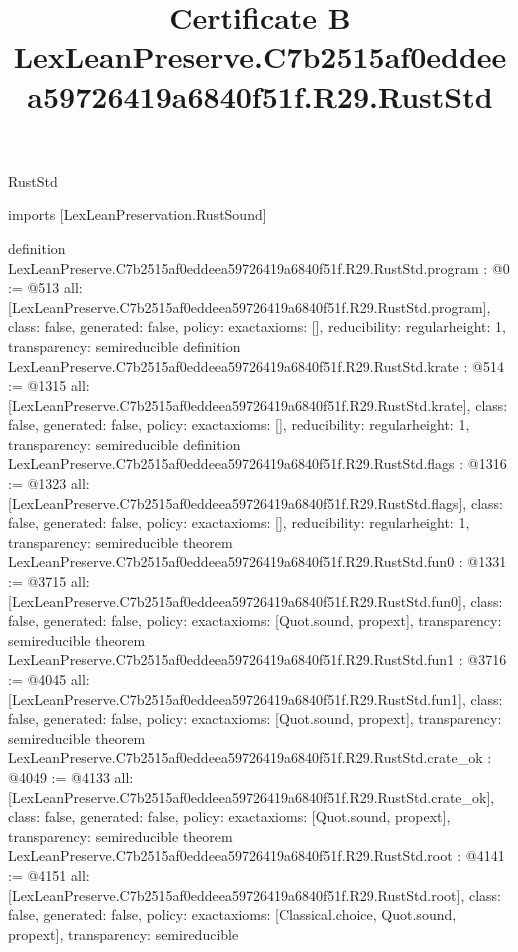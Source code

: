 \begin{lexlean}{RustStd}
\title{Certificate B LexLeanPreserve.C7b2515af0eddeea59726419a6840f51f.R29.RustStd}
\begin{coremodule}
imports [LexLeanPreservation.RustSound]

definition LexLeanPreserve.C7b2515af0eddeea59726419a6840f51f.R29.RustStd.program : @0 := @513 {
  all: [LexLeanPreserve.C7b2515af0eddeea59726419a6840f51f.R29.RustStd.program],
  class: false,
  generated: false,
  policy: exact{axioms: []},
  reducibility: regular{height: 1},
  transparency: semireducible
}
definition LexLeanPreserve.C7b2515af0eddeea59726419a6840f51f.R29.RustStd.krate : @514 := @1315 {
  all: [LexLeanPreserve.C7b2515af0eddeea59726419a6840f51f.R29.RustStd.krate],
  class: false,
  generated: false,
  policy: exact{axioms: []},
  reducibility: regular{height: 1},
  transparency: semireducible
}
definition LexLeanPreserve.C7b2515af0eddeea59726419a6840f51f.R29.RustStd.flags : @1316 := @1323 {
  all: [LexLeanPreserve.C7b2515af0eddeea59726419a6840f51f.R29.RustStd.flags],
  class: false,
  generated: false,
  policy: exact{axioms: []},
  reducibility: regular{height: 1},
  transparency: semireducible
}
theorem LexLeanPreserve.C7b2515af0eddeea59726419a6840f51f.R29.RustStd.fun0 : @1331 := @3715 {
  all: [LexLeanPreserve.C7b2515af0eddeea59726419a6840f51f.R29.RustStd.fun0],
  class: false,
  generated: false,
  policy: exact{axioms: [Quot.sound, propext]},
  transparency: semireducible
}
theorem LexLeanPreserve.C7b2515af0eddeea59726419a6840f51f.R29.RustStd.fun1 : @3716 := @4045 {
  all: [LexLeanPreserve.C7b2515af0eddeea59726419a6840f51f.R29.RustStd.fun1],
  class: false,
  generated: false,
  policy: exact{axioms: [Quot.sound, propext]},
  transparency: semireducible
}
theorem LexLeanPreserve.C7b2515af0eddeea59726419a6840f51f.R29.RustStd.crate_ok : @4049 := @4133 {
  all: [LexLeanPreserve.C7b2515af0eddeea59726419a6840f51f.R29.RustStd.crate_ok],
  class: false,
  generated: false,
  policy: exact{axioms: [Quot.sound, propext]},
  transparency: semireducible
}
theorem LexLeanPreserve.C7b2515af0eddeea59726419a6840f51f.R29.RustStd.root : @4141 := @4151 {
  all: [LexLeanPreserve.C7b2515af0eddeea59726419a6840f51f.R29.RustStd.root],
  class: false,
  generated: false,
  policy: exact{axioms: [Classical.choice, Quot.sound, propext]},
  transparency: semireducible
}


\end{coremodule}
\end{lexlean}
